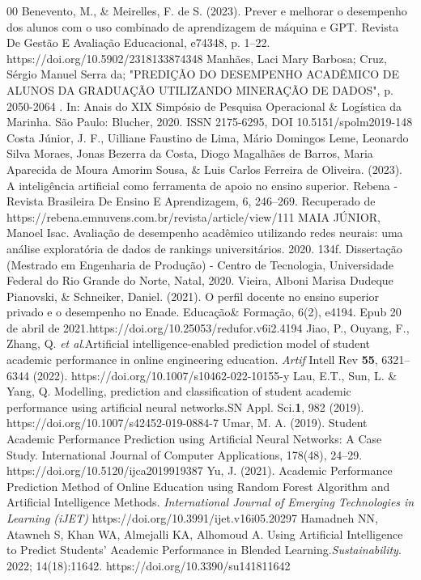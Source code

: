 \documentclass[conference]{IEEEtran}
\begin{document}
\begin{thebibliography} {00}
 Benevento, M., \& Meirelles, F. de S. (2023). Prever e melhorar o desempenho dos alunos com o uso combinado de aprendizagem de máquina e GPT. Revista De Gestão E Avaliação Educacional, e74348, p. 1–22. https://doi.org/10.5902/2318133874348
 Manhães, Laci Mary Barbosa; Cruz, Sérgio Manuel Serra da; "PREDIÇÃO DO DESEMPENHO ACADÊMICO DE ALUNOS DA GRADUAÇÃO UTILIZANDO MINERAÇÃO DE DADOS", p. 2050-2064 . In: Anais do XIX Simpósio de Pesquisa Operacional \& Logística da Marinha. São Paulo: Blucher, 2020.
ISSN 2175-6295, DOI 10.5151/spolm2019-148
 Costa Júnior, J. F., Uilliane Faustino de Lima, Mário Domingos Leme, Leonardo Silva Moraes, Jonas Bezerra da Costa, Diogo Magalhães de Barros, Maria Aparecida de Moura Amorim Sousa, \& Luis Carlos Ferreira de Oliveira. (2023). A inteligência artificial como ferramenta de apoio no ensino superior. Rebena - Revista Brasileira De Ensino E Aprendizagem, 6, 246–269. Recuperado de https://rebena.emnuvens.com.br/revista/article/view/111
 MAIA JÚNIOR, Manoel Isac. Avaliação de desempenho acadêmico utilizando redes neurais: uma análise exploratória de dados de rankings universitários. 2020. 134f. Dissertação (Mestrado em Engenharia de Produção) - Centro de Tecnologia, Universidade Federal do Rio Grande do Norte, Natal, 2020.
 Vieira, Alboni Marisa Dudeque Pianovski, \& Schneiker, Daniel. (2021). O perfil docente no ensino superior privado e o desempenho no Enade. Educação\& Formação, 6(2), e4194. Epub 20 de abril de 2021.https://doi.org/10.25053/redufor.v6i2.4194
 Jiao, P., Ouyang, F., Zhang, Q. \textit{et al}.Artificial intelligence-enabled prediction model of student academic performance in online engineering education. \textit{Artif} Intell Rev \textbf{55}, 6321–6344 (2022). https://doi.org/10.1007/s10462-022-10155-y 
 Lau, E.T., Sun, L. \& Yang, Q. Modelling, prediction and classification of student academic performance using artificial neural networks.SN Appl. Sci.\textbf{1}, 982 (2019). https://doi.org/10.1007/s42452-019-0884-7
 Umar, M. A. (2019). Student Academic Performance Prediction using Artificial Neural Networks: A Case Study. International Journal of Computer Applications, 178(48), 24–29. https://doi.org/10.5120/ijca2019919387 
 Yu, J. (2021). Academic Performance Prediction Method of Online Education using Random Forest Algorithm and Artificial Intelligence Methods. \textit{International Journal of Emerging Technologies in Learning (iJET)} https://doi.org/10.3991/ijet.v16i05.20297
 Hamadneh NN, Atawneh S, Khan WA, Almejalli KA, Alhomoud A. Using Artificial Intelligence to Predict Students’ Academic Performance in Blended Learning.\textit{Sustainability}. 2022; 14(18):11642. https://doi.org/10.3390/su141811642

\end{thebibliography}
\end{document}
